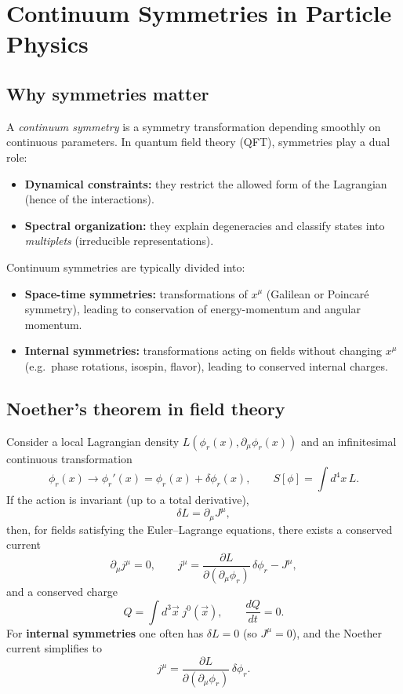\chapter{Continuum Symmetries in Particle Physics}

\section{Why symmetries matter}
A \emph{continuum symmetry} is a symmetry transformation depending smoothly on continuous parameters. In quantum field theory (QFT), symmetries play a dual role:
\begin{itemize}
  \item \textbf{Dynamical constraints:} they restrict the allowed form of the Lagrangian (hence of the interactions).
  \item \textbf{Spectral organization:} they explain degeneracies and classify states into \emph{multiplets} (irreducible representations).
\end{itemize}
Continuum symmetries are typically divided into:
\begin{itemize}
  \item \textbf{Space-time symmetries:} transformations of $x^\mu$ (Galilean or Poincar\'e symmetry), leading to conservation of energy-momentum and angular momentum.
  \item \textbf{Internal symmetries:} transformations acting on fields without changing $x^\mu$ (e.g.\ phase rotations, isospin, flavor), leading to conserved internal charges.
\end{itemize}

\section{Noether's theorem in field theory}
Consider a local Lagrangian density $L(\phi_r(x),\partial_\mu \phi_r(x))$ and an infinitesimal continuous transformation
\[
\phi_r(x)\to \phi_r'(x)=\phi_r(x)+\delta \phi_r(x),
\qquad
S[\phi]=\int d^4x\,L.
\]
If the action is invariant (up to a total derivative),
\[
\delta L = \partial_\mu J^\mu,
\]
then, for fields satisfying the Euler--Lagrange equations, there exists a conserved current
\[
\partial_\mu j^\mu=0,
\qquad
j^\mu=\frac{\partial L}{\partial(\partial_\mu\phi_r)}\,\delta \phi_r - J^\mu,
\]
and a conserved charge
\[
Q=\int d^3\vec x\; j^0(\vec x),\qquad \frac{dQ}{dt}=0.
\]
For \textbf{internal symmetries} one often has $\delta L=0$ (so $J^\mu=0$), and the Noether current simplifies to
\[
j^\mu=\frac{\partial L}{\partial(\partial_\mu\phi_r)}\,\delta\phi_r.
\]

